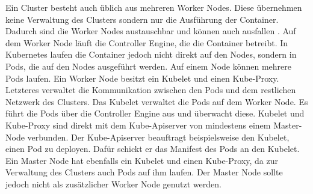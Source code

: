 Ein Cluster besteht auch üblich aus mehreren Worker Nodes. Diese übernehmen keine Verwaltung des Clusters sondern nur die Ausführung der Container. Dadurch sind die Worker Nodes austauschbar und  können auch ausfallen \parencite[vgl. 51]{welter2024kubernetes}. 
Auf dem Worker Node läuft die Controller Engine, die die Container betreibt.
In Kubernetes laufen die Container jedoch nicht direkt auf den Nodes, sondern in Pods, die auf den Nodes ausgeführt werden. Auf einem Node können mehrere Pods laufen.
Ein Worker Node besitzt ein Kubelet und einen Kube-Proxy. Letzteres verwaltet die Kommunikation zwischen den Pods und dem restlichen Netzwerk des Clusters. 
Das Kubelet verwaltet die Pods auf dem Worker Node. Es führt die Pods über die Controller Engine aus und überwacht diese.
Kubelet und Kube-Proxy sind direkt mit dem Kube-Apiserver von mindestens einem Master-Node verbunden. Der Kube-Apiserver beauftragt beispielsweise den Kubelet, einen Pod zu deployen. Dafür schickt er das Manifest des Pods an den Kubelet.
Ein Master Node hat ebenfalls ein Kubelet und einen Kube-Proxy, da zur Verwaltung des Clusters auch Pods auf ihm laufen. Der Master Node sollte jedoch nicht als zusätzlicher Worker Node genutzt werden.
\FloatBarrier